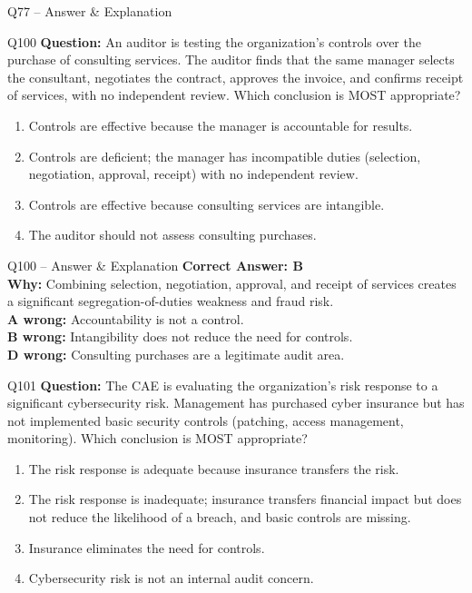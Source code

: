 \documentclass[aspectratio=169,10pt]{beamer}
\begin{document}
\begin{frame}[t]{Q77 -- Answer \& Explanation}
	\begin{frame}[t]{Q100}
		\small
		\textbf{Question:} An auditor is testing the organization's controls over the purchase of consulting services. The auditor finds that the same manager selects the consultant, negotiates the contract, approves the invoice, and confirms receipt of services, with no independent review. Which conclusion is MOST appropriate?
		\begin{enumerate}[label=\Alph*.,itemsep=1pt,topsep=2pt]
			\item Controls are effective because the manager is accountable for results.
			\item Controls are deficient; the manager has incompatible duties (selection, negotiation, approval, receipt) with no independent review.
			\item Controls are effective because consulting services are intangible.
			\item The auditor should not assess consulting purchases.
		\end{enumerate}
	\end{frame}
	
	\begin{frame}[t]{Q100 -- Answer \& Explanation}
		\small
		\textbf{Correct Answer: B} \\[4pt]
		\textbf{Why:} Combining selection, negotiation, approval, and receipt of services creates a significant segregation-of-duties weakness and fraud risk. \\[4pt]
		\textbf{A wrong:} Accountability is not a control. \\[2pt]
		\textbf{B wrong:} Intangibility does not reduce the need for controls. \\[2pt]
		\textbf{D wrong:} Consulting purchases are a legitimate audit area.
	\end{frame}
	
	\begin{frame}[t]{Q101}
		\small
		\textbf{Question:} The CAE is evaluating the organization's risk response to a significant cybersecurity risk. Management has purchased cyber insurance but has not implemented basic security controls (patching, access management, monitoring). Which conclusion is MOST appropriate?
		\begin{enumerate}[label=\Alph*.,itemsep=1pt,topsep=2pt]
			\item The risk response is adequate because insurance transfers the risk.
			\item The risk response is inadequate; insurance transfers financial impact but does not reduce the likelihood of a breach, and basic controls are missing.
			\item Insurance eliminates the need for controls.
			\item Cybersecurity risk is not an internal audit concern.
		\end{enumerate}
	\end{frame}
	

\end{frame}
\end{document}
